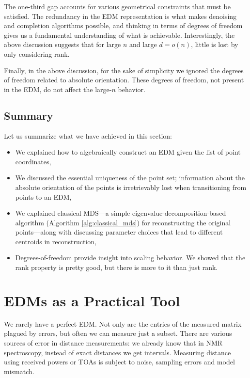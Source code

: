 \documentclass[10pt,double]{IEEEtran}
\newcommand{\rev}[1]{{#1}}
\begin{document}
The one-third gap accounts for various geometrical constraints that must be
satisfied. The redundancy in the EDM representation is what makes denoising
and completion algorithms possible, and thinking in terms of degrees of freedom
gives us a fundamental understanding of what is achievable. Interestingly, the
above discussion suggests that for large $n$ and large $d = o(n)$, little is
lost by only considering rank.

\rev{Finally, in the above discussion, for the sake of simplicity we ignored the
degrees of freedom related to absolute orientation. These degrees of freedom,
not present in the EDM, do not affect the large-$n$ behavior.}

\subsection{Summary}

Let us summarize what we have achieved in this section:
\begin{itemize}
	\item We explained how to algebraically construct an EDM given the list of
	point coordinates,
	\item We discussed the essential uniqueness of the point set; information
	about the absolute orientation of the points is irretrievably lost when
	transitioning from points to an EDM,
  \item We explained classical MDS---a simple eigenvalue-decomposition-based algorithm
  (Algorithm \ref{alg:classical_mds}) for reconstructing the original points---along with discussing parameter choices that lead to different centroids in
  reconstruction,
	\item Degrees-of-freedom provide insight into scaling behavior. We
	showed that the rank property is pretty good, but there is more to it than
	just rank.
\end{itemize}



\section{EDMs as a Practical Tool} \label{sec:edms_as_a_practical_tool}

We rarely have a perfect EDM. Not only are the entries of the measured matrix
plagued by errors, but often we can measure just a subset. There are various
sources of error in distance measurements: we already know that in NMR
spectroscopy, instead of exact distances we get intervals. Measuring distance
using received powers or TOAs is subject to noise, sampling errors and model
mismatch.
\end{document}
